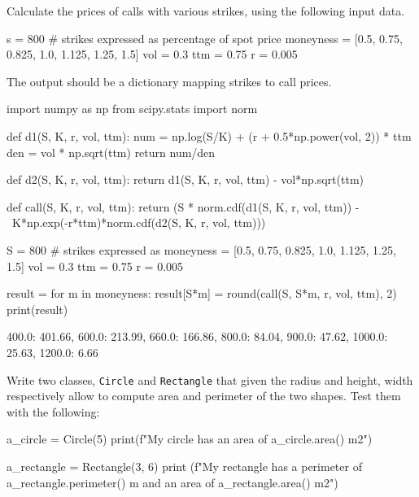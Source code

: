 \cprotEnv\begin{question}
Calculate the prices of calls with various strikes, using the following input data.

\begin{ipython}
s = 800 
# strikes expressed as percentage of spot price
moneyness = [0.5, 0.75, 0.825, 1.0, 1.125, 1.25, 1.5]
vol = 0.3
ttm = 0.75
r = 0.005
\end{ipython}
\noindent
The output should be a dictionary mapping strikes to call prices.
\end{question}

\cprotEnv\begin{solution}
\begin{ipython}
import numpy as np
from scipy.stats import norm

def d1(S, K, r, vol, ttm):
    num = np.log(S/K) + (r + 0.5*np.power(vol, 2)) * ttm
    den = vol * np.sqrt(ttm)
    return num/den

def d2(S, K, r, vol, ttm):
    return d1(S, K, r, vol, ttm) - vol*np.sqrt(ttm)

def call(S, K, r, vol, ttm):
    return (S * norm.cdf(d1(S, K, r, vol, ttm)) - \
           K*np.exp(-r*ttm)*norm.cdf(d2(S, K, r, vol, ttm)))

S = 800
# strikes expressed as %
moneyness = [0.5, 0.75, 0.825, 1.0, 1.125, 1.25, 1.5]
vol = 0.3
ttm = 0.75
r = 0.005

result = {}
for m in moneyness:
    result[S*m] = round(call(S, S*m, r, vol, ttm), 2)
print(result)
\end{ipython}
\begin{ioutput}
{400.0: 401.66, 
 600.0: 213.99, 
 660.0: 166.86, 
 800.0: 84.04, 
 900.0: 47.62, 
 1000.0: 25.63, 
 1200.0: 6.66}
\end{ioutput}
\end{solution}

\cprotEnv\begin{question}
Write two classes, \texttt{Circle} and \texttt{Rectangle} that given the radius and height, width respectively allow to compute area and perimeter of the two shapes. Test them with the following:

\begin{ipython}
a_circle = Circle(5)
print(f"My circle has an area of {a_circle.area()} m2")

a_rectangle = Rectangle(3, 6)
print (f"My rectangle has a perimeter of {a_rectangle.perimeter()} m and an area of {a_rectangle.area()} m2")
\end{ipython}
\end{question}


